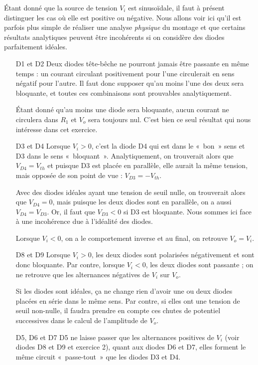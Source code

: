 \documentclass{../../template/tp}
\begin{document}
{%
Étant donné que la source de tension $V_i$ est sinusoïdale, il faut à présent distinguer les cas où elle est positive ou négative.
Nous allons voir ici qu'il est parfois plus simple de réaliser une analyse \textit{physique} du montage et que certains résultats analytiques peuvent être incohérents si on considère des diodes parfaitement idéales.
\begin{itemize}
    \item[D1 et D2]
    Deux diodes tête-bêche ne pourront jamais être passante en même temps : un courant circulant positivement pour l'une circulerait en sens négatif pour l'autre.
    Il faut donc supposer qu'au moins l'une des deux sera bloquante, et toutes ces combinaisons sont prouvables analytiquement.
    
    Étant donné qu'au moins une diode sera bloquante, aucun courant ne circulera dans $R_1$ et $V_o$ sera toujours nul. C'est bien ce seul résultat qui nous intéresse dans cet exercice.

    \item[D3 et D4]
    Lorsque $V_i > 0$, c'est la diode D4 qui est dans le «~bon~» sens et D3 dans le sens «~bloquant~».
    Analytiquement, on trouverait alors que $V_{D4} = V_{th}$ et puisque D3 est placée en parallèle, elle aurait la même tension, mais opposée de son point de vue : $V_{D3} = - V_{th}$.


    Avec des diodes idéales ayant une tension de seuil nulle, on trouverait alors que $V_{D4} = 0$, mais puisque les deux diodes sont en parallèle, on a aussi $V_{D4} = V_{D3}$. Or, il faut que $V_{D3} < 0$ si D3 est bloquante.
    Nous sommes ici face à une incohérence due à l'idéalité des diodes.

    Lorsque $V_i < 0$, on a le comportement inverse et au final, on retrouve $V_o = V_i$.

    \item[D8 et D9]
    Lorsque $V_i > 0$, les deux diodes sont polarisées négativement et sont donc bloquante.
    Par contre, lorsque $V_i < 0$, les deux diodes sont passante ; on ne retrouve que les alternances négatives de $V_i$ sur $V_o$.

    Si les diodes sont idéales, ça ne change rien d'avoir une ou deux diodes placées en série dans le même sens. Par contre, si elles ont une tension de seuil non-nulle, il faudra prendre en compte ces chutes de potentiel successives dans le calcul de l'amplitude de $V_o$.

    \item[D5, D6 et D7]
    D5 ne laisse passer que les alternances positives de $V_i$ (voir diodes D8 et D9 et exercice 2), quant aux diodes D6 et D7, elles forment le même circuit «~passe-tout~» que les diodes D3 et D4.
\end{itemize} 

}
\end{document}
